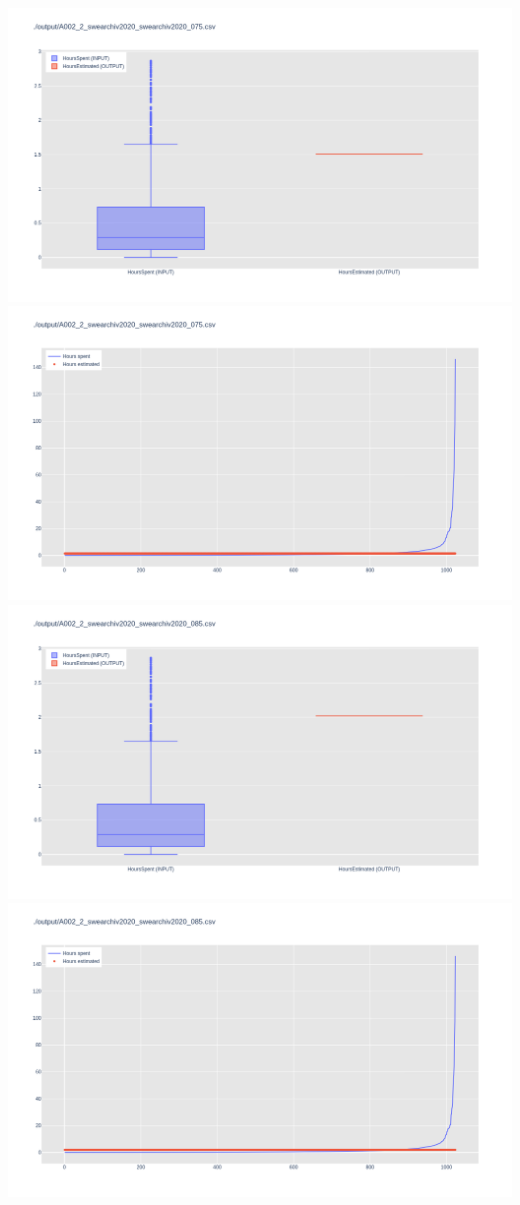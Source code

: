 \includegraphics[width=\textwidth]{Scripts/output/A002_2_swearchiv2020_swearchiv2020_075.csv.png}
\includegraphics[width=\textwidth]{Scripts/output/A002_2_swearchiv2020_swearchiv2020_075.csv.scatter.png}
\includegraphics[width=\textwidth]{Scripts/output/A002_2_swearchiv2020_swearchiv2020_085.csv.png}
\includegraphics[width=\textwidth]{Scripts/output/A002_2_swearchiv2020_swearchiv2020_085.csv.scatter.png}
